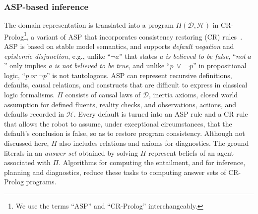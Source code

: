 \documentclass{article}
\begin{document}

\subsubsection{ASP-based inference}
The domain representation is translated into a program
$\Pi(\mathcal{D}, \mathcal{H})$ in CR-Prolog\footnote{We use the terms
  ``ASP'' and ``CR-Prolog'' interchangeably.}, a variant of ASP that
incorporates consistency restoring (CR)
rules~\cite{balduccini:aaaisymp03}. ASP is based on stable model
semantics, and supports \emph{default negation} and \emph{epistemic
  disjunction}, e.g., unlike ``$\lnot a$'' that states \emph{a is
  believed to be false}, ``$not~a$'' only implies \emph{a is not
  believed to be true}, and unlike ``$p~\lor\,\,\lnot p$'' in
propositional logic, ``$p~or~\lnot p$'' is not tautologous.  ASP can
represent recursive definitions, defaults, causal relations, and
constructs that are difficult to express in classical logic
formalisms. $\Pi$ consists of causal laws of $\mathcal{D}$, inertia
axioms, closed world assumption for defined fluents, reality checks,
and observations, actions, and defaults recorded in $\mathcal{H}$.
Every default is turned into an ASP rule and a CR rule that allows the
robot to assume, under exceptional circumstances, that the default's
conclusion is false, so as to restore program consistency. Although
not discussed here, $\Pi$ also includes relations and axioms for
diagnostics. The ground literals in an \emph{answer set} obtained by
solving $\Pi$ represent beliefs of an agent associated with $\Pi$.
Algorithms for computing the entailment, and for inference, planning
and diagnostics, reduce these tasks to computing answer sets of
CR-Prolog programs.
\end{document}
